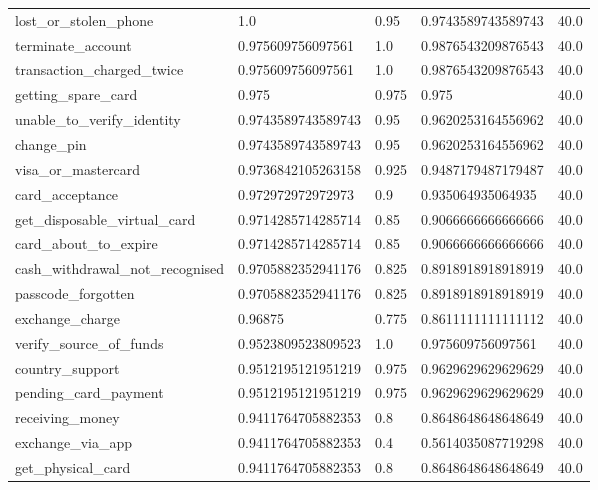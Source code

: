 \begin{table}[!ht]
\begin{tabularx}{\textwidth}{X l l l l}
lost\_or\_stolen\_phone & \num{1.0} & \num{0.95} & \num{0.9743589743589743} & \num{40.0} \\
terminate\_account & \num{0.975609756097561} & \num{1.0} & \num{0.9876543209876543} & \num{40.0} \\
transaction\_charged\_twice & \num{0.975609756097561} & \num{1.0} & \num{0.9876543209876543} & \num{40.0} \\
getting\_spare\_card & \num{0.975} & \num{0.975} & \num{0.975} & \num{40.0} \\
unable\_to\_verify\_identity & \num{0.9743589743589743} & \num{0.95} & \num{0.9620253164556962} & \num{40.0} \\
change\_pin & \num{0.9743589743589743} & \num{0.95} & \num{0.9620253164556962} & \num{40.0} \\
visa\_or\_mastercard & \num{0.9736842105263158} & \num{0.925} & \num{0.9487179487179487} & \num{40.0} \\
card\_acceptance & \num{0.972972972972973} & \num{0.9} & \num{0.935064935064935} & \num{40.0} \\
get\_disposable\_virtual\_card & \num{0.9714285714285714} & \num{0.85} & \num{0.9066666666666666} & \num{40.0} \\
card\_about\_to\_expire & \num{0.9714285714285714} & \num{0.85} & \num{0.9066666666666666} & \num{40.0} \\
cash\_withdrawal\_not\_recognised & \num{0.9705882352941176} & \num{0.825} & \num{0.8918918918918919} & \num{40.0} \\
passcode\_forgotten & \num{0.9705882352941176} & \num{0.825} & \num{0.8918918918918919} & \num{40.0} \\
exchange\_charge & \num{0.96875} & \num{0.775} & \num{0.8611111111111112} & \num{40.0} \\
verify\_source\_of\_funds & \num{0.9523809523809523} & \num{1.0} & \num{0.975609756097561} & \num{40.0} \\
country\_support & \num{0.9512195121951219} & \num{0.975} & \num{0.9629629629629629} & \num{40.0} \\
pending\_card\_payment & \num{0.9512195121951219} & \num{0.975} & \num{0.9629629629629629} & \num{40.0} \\
receiving\_money & \num{0.9411764705882353} & \num{0.8} & \num{0.8648648648648649} & \num{40.0} \\
exchange\_via\_app & \num{0.9411764705882353} & \num{0.4} & \num{0.5614035087719298} & \num{40.0} \\
get\_physical\_card & \num{0.9411764705882353} & \num{0.8} & \num{0.8648648648648649} & \num{40.0} \\

\end{tabularx}
\end{table}

